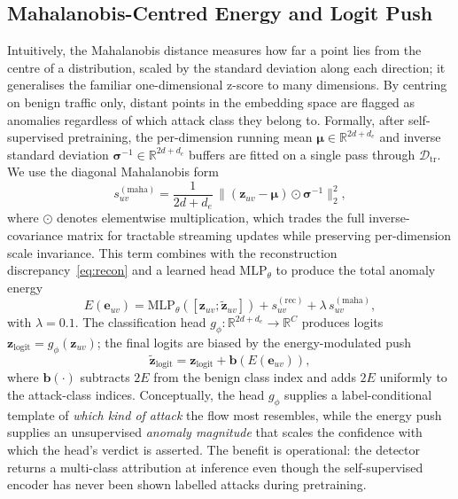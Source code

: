 \documentclass{ieeeaccess}
\begin{document}
\subsection{Mahalanobis-Centred Energy and Logit Push}
\label{sec:method:energy}
Intuitively, the Mahalanobis distance measures how far a point lies from
the centre of a distribution, scaled by the standard deviation along each
direction; it generalises the familiar one-dimensional z-score to many
dimensions. By centring on benign traffic only, distant points in the
embedding space are flagged as anomalies regardless of which attack class
they belong to. Formally, after self-supervised pretraining, the
per-dimension running mean $\bm{\mu} \in \mathbb{R}^{2d+d_e}$ and inverse
standard deviation $\bm{\sigma}^{-1} \in \mathbb{R}^{2d+d_e}$ buffers are
fitted on a single pass through $\mathcal{D}_\text{tr}$. We use the
diagonal Mahalanobis form
\begin{equation}
s_{uv}^{(\mathrm{maha})} = \frac{1}{2d+d_e}\,\|(\mathbf{z}_{uv} - \bm{\mu}) \odot \bm{\sigma}^{-1}\|_2^2,
\label{eq:maha}
\end{equation}
where $\odot$ denotes elementwise multiplication, which trades the full
inverse-covariance matrix for tractable streaming updates while
preserving per-dimension scale invariance. This term combines with the
reconstruction discrepancy~\eqref{eq:recon} and a learned head
$\mathrm{MLP}_\theta$ to produce the total anomaly energy
\begin{equation}
E(\mathbf{e}_{uv}) = \mathrm{MLP}_\theta([\mathbf{z}_{uv}; \tilde{\mathbf{z}}_{uv}]) + s_{uv}^{(\mathrm{rec})} + \lambda\,s_{uv}^{(\mathrm{maha})},
\label{eq:energy}
\end{equation}
with $\lambda = 0.1$. The classification head $g_\phi: \mathbb{R}^{2d+d_e}
\to \mathbb{R}^{C}$ produces logits $\mathbf{z}_{\mathrm{logit}} =
g_\phi(\mathbf{z}_{uv})$; the final logits are biased by the
energy-modulated push
\begin{equation}
\tilde{\mathbf{z}}_{\mathrm{logit}} = \mathbf{z}_{\mathrm{logit}} + \mathbf{b}(E(\mathbf{e}_{uv})),
\end{equation}
where $\mathbf{b}(\cdot)$ subtracts $2E$ from the benign class index and
adds $2E$ uniformly to the attack-class indices. Conceptually, the head
$g_\phi$ supplies a label-conditional template of \emph{which kind of
attack} the flow most resembles, while the energy push supplies an
unsupervised \emph{anomaly magnitude} that scales the confidence with
which the head's verdict is asserted. The benefit is operational: the
detector returns a multi-class attribution at inference even though the
self-supervised encoder has never been shown labelled attacks during
pretraining.
\end{document}
